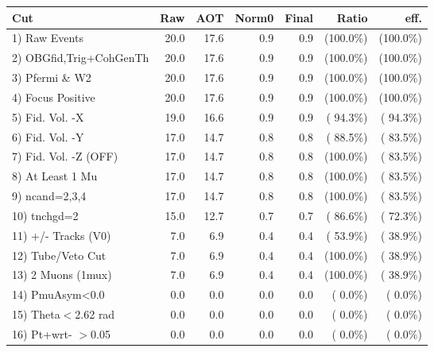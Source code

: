 \begin{table}[h!]\centering
 \begin{tabular}{||l||r|r|r|r|r|r||}
 \hline
 \hline
 Cut & Raw & AOT & Norm0 & Final & Ratio & eff.       \\
 \hline
  1) Raw Events           &         20.0 &         17.6 &          0.9 &          0.9 & (100.0\%) & (100.0\%) \\
  2) OBGfid,Trig+CohGenTh &         20.0 &         17.6 &          0.9 &          0.9 & (100.0\%) & (100.0\%) \\
  3) Pfermi \& W2         &         20.0 &         17.6 &          0.9 &          0.9 & (100.0\%) & (100.0\%) \\
  4) Focus Positive       &         20.0 &         17.6 &          0.9 &          0.9 & (100.0\%) & (100.0\%) \\
  5) Fid. Vol. -X         &         19.0 &         16.6 &          0.9 &          0.9 & ( 94.3\%) & ( 94.3\%) \\
  6) Fid. Vol. -Y         &         17.0 &         14.7 &          0.8 &          0.8 & ( 88.5\%) & ( 83.5\%) \\
  7) Fid. Vol. -Z (OFF)   &         17.0 &         14.7 &          0.8 &          0.8 & (100.0\%) & ( 83.5\%) \\
  8) At Least 1 Mu        &         17.0 &         14.7 &          0.8 &          0.8 & (100.0\%) & ( 83.5\%) \\
  9) ncand=2,3,4          &         17.0 &         14.7 &          0.8 &          0.8 & (100.0\%) & ( 83.5\%) \\
 10) tnchgd=2             &         15.0 &         12.7 &          0.7 &          0.7 & ( 86.6\%) & ( 72.3\%) \\
 11) +/- Tracks (V0)      &          7.0 &          6.9 &          0.4 &          0.4 & ( 53.9\%) & ( 38.9\%) \\
 12) Tube/Veto Cut        &          7.0 &          6.9 &          0.4 &          0.4 & (100.0\%) & ( 38.9\%) \\
 13) 2 Muons (1mux)       &          7.0 &          6.9 &          0.4 &          0.4 & (100.0\%) & ( 38.9\%) \\
 14) PmuAsym<0.0          &          0.0 &          0.0 &          0.0 &          0.0 & (  0.0\%) & (  0.0\%) \\
 15) Theta$<$2.62 rad     &          0.0 &          0.0 &          0.0 &          0.0 & (  0.0\%) & (  0.0\%) \\
 16) Pt+wrt- $>$0.05      &          0.0 &          0.0 &          0.0 &          0.0 & (  0.0\%) & (  0.0\%) \\

\end{tabular}
\end{table}
